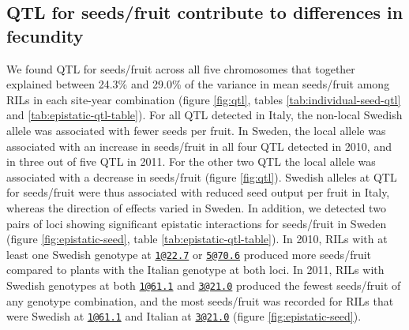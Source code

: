 \documentclass[]{article}
\begin{document}
\hypertarget{qtl-for-seedsfruit-contribute-to-differences-in-fecundity}{%
\subsection{QTL for seeds/fruit contribute to differences in fecundity}\label{qtl-for-seedsfruit-contribute-to-differences-in-fecundity}}

We found QTL for seeds/fruit across all five chromosomes that together explained between 24.3\% and 29.0\% of the variance in mean seeds/fruit among RILs in each site-year combination (figure \ref{fig:qtl}, tables \ref{tab:individual-seed-qtl} and \ref{tab:epistatic-qtl-table}). For all QTL detected in Italy, the non-local Swedish allele was associated with fewer seeds per fruit. In Sweden, the local allele was associated with an increase in seeds/fruit in all four QTL detected in 2010, and in three out of five QTL in 2011. For the other two QTL the local allele was associated with a decrease in seeds/fruit (figure \ref{fig:qtl}). Swedish alleles at QTL for seeds/fruit were thus associated with reduced seed output per fruit in Italy, whereas the direction of effects varied in Sweden. In addition, we detected two pairs of loci showing significant epistatic interactions for seeds/fruit in Sweden (figure \ref{fig:epistatic-seed}, table \ref{tab:epistatic-qtl-table}). In 2010, RILs with at least one Swedish genotype at \href{mailto:1@22.7}{\nolinkurl{1@22.7}} or \href{mailto:5@70.6}{\nolinkurl{5@70.6}} produced more seeds/fruit compared to plants with the Italian genotype at both loci. In 2011, RILs with Swedish genotypes at both \href{mailto:1@61.1}{\nolinkurl{1@61.1}} and \href{mailto:3@21.0}{\nolinkurl{3@21.0}} produced the fewest seeds/fruit of any genotype combination, and the most seeds/fruit was recorded for RILs that were Swedish at \href{mailto:1@61.1}{\nolinkurl{1@61.1}} and Italian at \href{mailto:3@21.0}{\nolinkurl{3@21.0}} (figure \ref{fig:epistatic-seed}).
\end{document}

